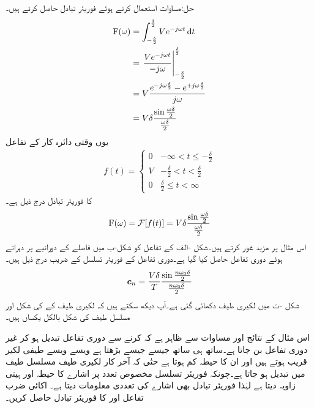 حل:مساوات  استعمال کرتے ہوئے فوریئر تبادل حاصل کرتے ہیں۔
\begin{align*}
\bF(\omega)&=\int_{-\frac{\delta}{2}}^{\frac{\delta}{2}} V e^{-j\omega t} \dif t\\
&=\left. \frac{V e^{-j\omega t}}{-j\omega}\right|_{-\frac{\delta}{2}}^{\frac{\delta}{2}}\\
&=V\frac{e^{-j\omega \frac{\delta}{2}}-e^{+j\omega \frac{\delta}{2}}}{j\omega}\\
&=V \delta \frac{\sin \frac{\omega \delta}{2}}{\frac{\omega \delta}{2}}
\end{align*}
یوں وقتی دائرہ کار کے تفاعل 
\begin{align}
f(t)=
\begin{cases}
0 & -\infty < t \le -\frac{\delta}{2}\\
V & -\frac{\delta}{2} < t < \frac{\delta}{2}\\
0& \frac{\delta}{2} \le t < \infty
\end{cases}
\end{align}
کا فوریئر تبادل  درج ذیل ہے۔
\begin{align}
{\ensuremath{{\textup{F}}}}(\omega)=\mathcal{F}[f(t)]=V \delta \frac{\sin \frac{\omega \delta}{2}}{\frac{\omega \delta}{2}}
\end{align}
اس مثال پر مزید غور کرتے ہیں۔شکل -الف کے تفاعل کو شکل-ب میں  فاصلے کے دورانیے پر دہراتے ہوئے  دوری تفاعل  حاصل کیا گیا ہے۔دوری تفاعل  کے فوریئر تسلسل کے  ضریب  درج ذیل ہیں۔
\begin{align}
{\ensuremath{{\boldsymbol{c}}}}_n=\frac{V \delta}{T} \frac{\sin\frac{n\omega_0 \delta}{2}}{\frac{n\omega_0 \delta}{2}}
\end{align}
شکل -ت میں لکیری طیف دکھائی گئی ہے۔آپ دیکھ سکتے ہیں کہ  لکیری طیف کے  کی شکل اور مسلسل طیف کی شکل بالکل یکساں ہیں۔

اس مثال کے نتائج اور مساوات سے ظاہر ہے کہ  کرنے سے دوری تفاعل تبدیل ہو کر غیر دوری تفاعل بن جاتا ہے۔ساتھ ہی ساتھ جیسے جیسے  بڑھتا ہے ویسے ویسے طیفی لکیر قریب ہوتے ہیں اور ان کا حیطہ کم  ہوتا ہے حتٰی کہ آخر کار لکیری طیف مسلسل طیف میں تبدیل ہو جاتا ہے۔چونکہ فوریئر تسلسل مخصوص تعدد پر اشارے کا حیطہ اور ہیتی زاویہ دیتا ہے لہٰذا فوریئر تبادل بھی اشارے کی تعددی معلومات دیتا ہے۔ 
اکائی ضرب تفاعل  اور  کا فوریئر تبادل حاصل کریں۔

